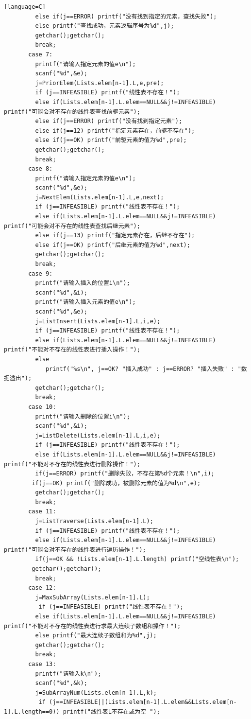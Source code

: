 \documentclass[supercite]{Experimental_Report}
\theoremstyle{definition}
\begin{document}
\begin{sloppypar}
\begin{lstlisting}[breaklines][language=C]
		 else if(j==ERROR) printf("没有找到指定的元素，查找失败");
		 else printf("查找成功，元素逻辑序号为%d",j);
		 getchar();getchar();
		 break;
	   case 7:
		 printf("请输入指定元素的值e\n");
		 scanf("%d",&e);  
		 j=PriorElem(Lists.elem[n-1].L,e,pre); 
		 if (j==INFEASIBLE) printf("线性表不存在！"); 
		 else if(Lists.elem[n-1].L.elem==NULL&&j!=INFEASIBLE) printf("可能会对不存在的线性表查找前驱元素");
		 else if(j==ERROR) printf("没有找到指定元素");
		 else if(j==12) printf("指定元素存在，前驱不存在");
		 else if(j==OK) printf("前驱元素的值为%d",pre);
		 getchar();getchar();
		 break;
	   case 8:
		 printf("请输入指定元素的值e\n");
		 scanf("%d",&e);
		 j=NextElem(Lists.elem[n-1].L,e,next);  
		 if (j==INFEASIBLE) printf("线性表不存在！"); 
		 else if(Lists.elem[n-1].L.elem==NULL&&j!=INFEASIBLE) printf("可能会对不存在的线性表查找后继元素");
		 else if(j==13) printf("指定元素存在，后继不存在");
		 else if(j==OK) printf("后继元素的值为%d",next);
		 getchar();getchar();
		 break;
	   case 9:
		 printf("请输入插入的位置i\n");
		 scanf("%d",&i);  
		 printf("请输入插入元素的值e\n");
		 scanf("%d",&e);
		 j=ListInsert(Lists.elem[n-1].L,i,e); 
		 if (j==INFEASIBLE) printf("线性表不存在！"); 
		 else if(Lists.elem[n-1].L.elem==NULL&&j!=INFEASIBLE) printf("不能对不存在的线性表进行插入操作！");
		 else
		 	printf("%s\n", j==OK? "插入成功" : j==ERROR? "插入失败" : "数据溢出");
		 getchar();getchar();
		 break;
	   case 10:
		 printf("请输入删除的位置i\n");
		 scanf("%d",&i);
		 j=ListDelete(Lists.elem[n-1].L,i,e);
		 if (j==INFEASIBLE) printf("线性表不存在！"); 
		 else if(Lists.elem[n-1].L.elem==NULL&&j!=INFEASIBLE) printf("不能对不存在的线性表进行删除操作！");
		 if(j==ERROR) printf("删除失败，不存在第%d个元素！\n",i);
		if(j==OK) printf("删除成功，被删除元素的值为%d\n",e);
		 getchar();getchar();
		 break;
	   case 11:
		 j=ListTraverse(Lists.elem[n-1].L);
		 if (j==INFEASIBLE) printf("线性表不存在！"); 
		 else if(Lists.elem[n-1].L.elem==NULL&&j!=INFEASIBLE) printf("可能会对不存在的线性表进行遍历操作！");
		 if(j==OK && !Lists.elem[n-1].L.length) printf("空线性表\n");
		getchar();getchar();
		 break;
	   case 12:
	   	 j=MaxSubArray(Lists.elem[n-1].L);
	   	  if (j==INFEASIBLE) printf("线性表不存在！"); 
		 else if(Lists.elem[n-1].L.elem==NULL&&j!=INFEASIBLE) printf("不能对不存在的线性表进行求最大连续子数组和操作！");
		 else printf("最大连续子数组和为%d",j);
	   	 getchar();getchar();
		 break;
	   case 13:
	   	 printf("请输入k\n");
		 scanf("%d",&k);    
	   	 j=SubArrayNum(Lists.elem[n-1].L,k);
	   	  if (j==INFEASIBLE||(Lists.elem[n-1].L.elem&&Lists.elem[n-1].L.length==0)) printf("线性表L不存在或为空 "); 

\end{lstlisting}
\end{sloppypar}
\end{document}
